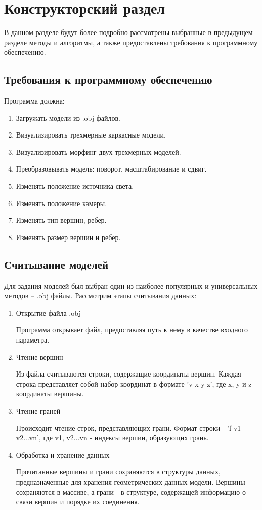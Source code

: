 \chapter{Конструкторский раздел}

В данном разделе будут более подробно рассмотрены выбранные в предыдущем разделе методы и алгоритмы, а также предоставлены требования к программному обеспечению.

\section{Требования к программному обеспечению}

Программа должна:
\begin{enumerate}
	\item Загружать модели из .obj файлов.
	\item Визуализировать трехмерные каркасные модели.
	\item Визуализировать морфинг двух трехмерных моделей.
	\item Преобразовывать модель: поворот, масштабирование и сдвиг.
	\item Изменять положение источника света.
	\item Изменять положение камеры.
	\item Изменять тип вершин, ребер.
	\item Изменять размер вершин и ребер.
\end{enumerate}


\section{Считывание моделей}

Для задания моделей был выбран один из наиболее популярных и универсальных методов – .obj файлы. 
Рассмотрим этапы считывания данных:

\begin{enumerate}
	\item Открытие файла .obj
	
	Программа открывает файл, предоставляя путь к нему в качестве входного параметра.
	
	\item Чтение вершин
	
	Из файла считываются строки, содержащие координаты вершин. 
	Каждая строка представляет собой набор координат в формате 'v x y z', где x, y и z - координаты вершины.
	
	\item Чтение граней
	
	Происходит чтение строк, представляющих грани. 
	Формат строки - 'f v1 v2...vn', где v1, v2...vn - индексы вершин, образующих грань.
	
	\item Обработка и хранение данных
	
	Прочитанные вершины и грани сохраняются в структуры данных, предназначенные для хранения геометрических данных 
	модели. 
	Вершины сохраняются в массиве, а грани - в структуре, содержащей информацию о связи вершин и порядке их соединения.
	
\end{enumerate}


